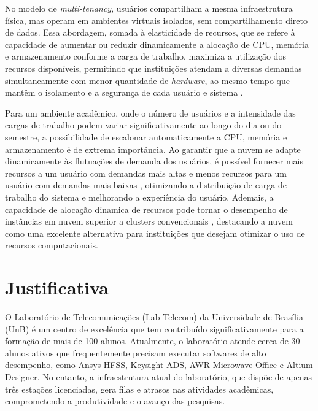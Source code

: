 No modelo de \textit{multi-tenancy}, usuários compartilham a mesma infraestrutura física, mas operam em ambientes virtuais isolados, sem compartilhamento direto de dados. Essa abordagem, somada à elasticidade de recursos, que se refere à capacidade de aumentar ou reduzir dinamicamente a alocação de CPU, memória e armazenamento conforme a carga de trabalho, maximiza a utilização dos recursos disponíveis, permitindo que instituições atendam a diversas demandas simultaneamente com menor quantidade de \textit{hardware}, ao mesmo tempo que mantêm o isolamento e a segurança de cada usuário e sistema \cite{heuchert2021}.

Para um ambiente acadêmico, onde o número de usuários e a intensidade das cargas de trabalho podem variar significativamente ao longo do dia ou do semestre, a possibilidade de escalonar automaticamente a CPU, memória e armazenamento é de extrema importância. Ao garantir que a nuvem se adapte dinamicamente às flutuações de demanda dos usuários, é possível fornecer mais recursos a um usuário com demandas mais altas e menos recursos para um usuário com demandas mais baixas \cite{armbrust2010, oliveira2015}, otimizando a distribuição de carga de trabalho do sistema e melhorando a experiência do usuário. Ademais, a capacidade de alocação dinamica de recursos pode tornar o desempenho de instâncias em nuvem superior a clusters convencionais \cite{roloff2012}, destacando a nuvem como uma excelente alternativa para instituições que desejam otimizar o uso de recursos computacionais.

\section{Justificativa}

O Laboratório de Telecomunicações (Lab Telecom) da Universidade de Brasília (UnB) é um centro de excelência que tem contribuído significativamente para a formação de mais de 100 alunos. Atualmente, o laboratório atende cerca de 30 alunos ativos que frequentemente precisam executar softwares de alto desempenho, como Ansys HFSS, Keysight ADS, AWR Microwave Office e Altium Designer. No entanto, a infraestrutura atual do laboratório, que dispõe de apenas três estações licenciadas, gera filas e atrasos nas atividades acadêmicas, comprometendo a produtividade e o avanço das pesquisas.


